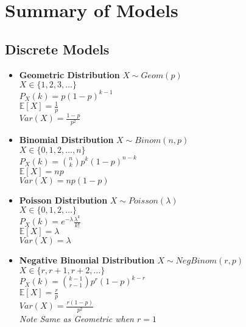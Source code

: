 \documentclass{article}
\begin{document}
\begin{enumerate}
\end{enumerate}

\newpage
\section{Summary of Models}
\label{sec:models}
\subsection{Discrete Models}
\label{sec:discrete}
\begin{itemize}
    \item \textbf{Geometric Distribution} $X\sim Geom(p)$\\
    $X\in\{1,2,3,\dots\}$\\
    $P_X(k)=p(1-p)^{k-1}$\\
    $\mathbb{E}[X]=\frac{1}{p}$\\
    $Var(X)=\frac{1-p}{p^2}$
    \item \textbf{Binomial Distribution} $X\sim Binom(n,p)$\\
    $X\in\{0,1,2,\dots,n\}$\\
    $P_X(k)=\binom{n}{k}p^k(1-p)^{n-k}$\\
    $\mathbb{E}[X]=np$\\
    $Var(X)=np(1-p)$
    \item \textbf{Poisson Distribution} $X\sim Poisson(\lambda)$\\
    $X\in\{0,1,2,\dots\}$\\
    $P_X(k)=e^{-\lambda}\frac{\lambda^k}{k!}$\\
    $\mathbb{E}[X]=\lambda$\\
    $Var(X)=\lambda$
    \item \textbf{Negative Binomial Distribution} $X\sim NegBinom(r,p)$\\
    $X\in\{r,r+1,r+2,\dots\}$\\
    $P_X(k)=\binom{k-1}{r-1}p^r(1-p)^{k-r}$\\
    $\mathbb{E}[X]=\frac{r}{p}$\\
    $Var(X)=\frac{r(1-p)}{p^2}$\\
    \textit{Note Same as Geometric when $r=1$}
\end{itemize}
\end{document}
